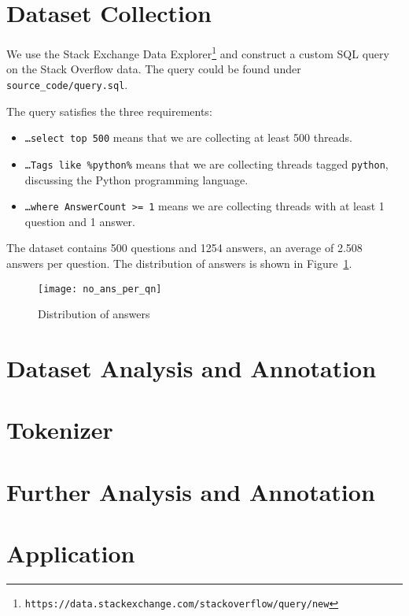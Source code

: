 \section{Dataset Collection}

We use the Stack Exchange Data
Explorer\footnote{\texttt{https://data.stackexchange.com/stackoverflow/query/new}}
and construct a custom SQL query on the Stack Overflow data. The query could be
found under \texttt{source\_code/query.sql}.

The query satisfies the three requirements:

\begin{itemize}
    \item \texttt{\ldots select top 500} means that we are collecting at least
    500 threads.
    \item \texttt{\ldots Tags like \textquotesingle{}\%python\%\textquotesingle{}}
    means that we are collecting threads tagged \texttt{python}, discussing the
    Python programming language.
    \item \texttt{\ldots where AnswerCount >= 1} means we are collecting
    threads with at least 1 question and 1 answer.
\end{itemize}

The dataset contains 500 questions and 1254 answers, an average of 2.508 answers
per question. The distribution of answers is shown in Figure~\ref{ans-dist}.

\begin{figure}[h]
\texttt{[image: no\_ans\_per\_qn]}
\caption{Distribution of answers}\label{ans-dist}
\end{figure}

\section{Dataset Analysis and Annotation}

\section{Tokenizer}

\section{Further Analysis and Annotation}

\section{Application}